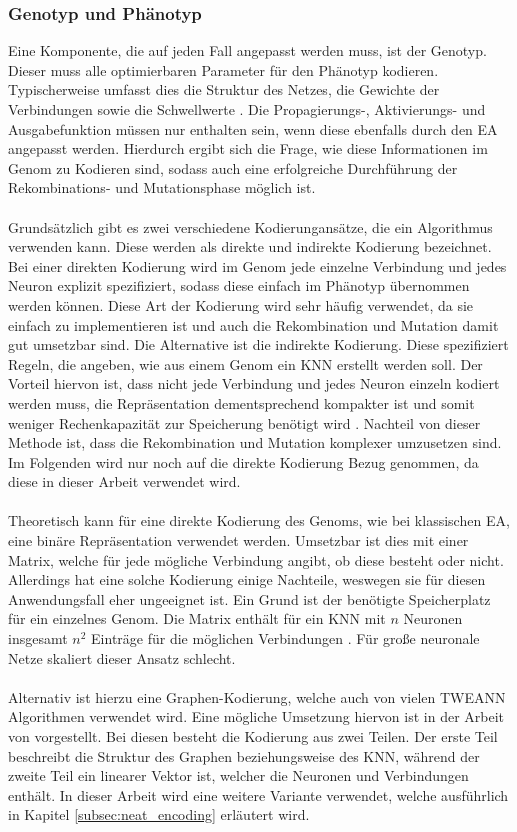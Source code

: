 \subsubsection{Genotyp und Phänotyp}
Eine Komponente, die auf jeden Fall angepasst werden muss, ist der Genotyp. Dieser muss alle optimierbaren Parameter für den Phänotyp kodieren. Typischerweise umfasst dies die Struktur des Netzes, die Gewichte der Verbindungen sowie die Schwellwerte \cite{stanley2002evolving}. Die Propagierungs-, Aktivierungs- und Ausgabefunktion müssen nur enthalten sein, wenn diese ebenfalls durch den \ac{EA} angepasst werden. Hierdurch ergibt sich die Frage, wie diese Informationen im Genom zu Kodieren sind, sodass auch eine erfolgreiche Durchführung der Rekombinations- und Mutationsphase möglich ist. 
\\\\
Grundsätzlich gibt es zwei verschiedene Kodierungansätze, die ein Algorithmus verwenden kann. Diese werden als direkte und indirekte Kodierung bezeichnet. Bei einer direkten Kodierung wird im Genom jede einzelne Verbindung und jedes Neuron explizit spezifiziert, sodass diese einfach im Phänotyp übernommen werden können. Diese Art der Kodierung wird sehr häufig verwendet, da sie einfach zu implementieren ist und auch die Rekombination und Mutation damit gut umsetzbar sind. Die Alternative ist die indirekte Kodierung. Diese spezifiziert Regeln, die angeben, wie aus einem Genom ein \ac{KNN} erstellt werden soll. Der Vorteil hiervon ist, dass nicht jede Verbindung und jedes Neuron einzeln kodiert werden muss, die Repräsentation dementsprechend kompakter ist und somit weniger Rechenkapazität zur Speicherung benötigt wird \cite{stanley2002evolving}. Nachteil von dieser Methode ist, dass die Rekombination und Mutation komplexer umzusetzen sind. Im Folgenden wird nur noch auf die direkte Kodierung Bezug genommen, da diese in dieser Arbeit verwendet wird.
\\\\
Theoretisch kann für eine direkte Kodierung des Genoms, wie bei klassischen \ac{EA}, eine binäre Repräsentation verwendet werden. Umsetzbar ist dies mit einer Matrix, welche für jede mögliche Verbindung angibt, ob diese besteht oder nicht. Allerdings hat eine solche Kodierung einige Nachteile, weswegen sie für diesen Anwendungsfall eher ungeeignet ist. Ein Grund ist der benötigte Speicherplatz für ein einzelnes Genom. Die Matrix enthält für ein \ac{KNN} mit $n$ Neuronen insgesamt $n^2$ Einträge für die möglichen Verbindungen \cite{stanley2002evolving}. Für große neuronale Netze skaliert dieser Ansatz schlecht.
\\\\
Alternativ ist hierzu eine Graphen-Kodierung, welche auch von vielen \ac{TWEANN} Algorithmen verwendet wird. Eine mögliche Umsetzung hiervon ist in der Arbeit \cite{pujol1998evolving} von \citeauthor{pujol1998evolving} vorgestellt. Bei diesen besteht die Kodierung aus zwei Teilen. Der erste Teil beschreibt die Struktur des Graphen beziehungsweise des \ac{KNN}, während der zweite Teil ein linearer Vektor ist, welcher die Neuronen und Verbindungen enthält. In dieser Arbeit wird eine weitere Variante verwendet, welche ausführlich in Kapitel \ref{subsec:neat_encoding} erläutert wird.

